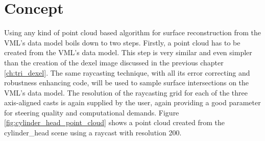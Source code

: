\section{Concept}
\label{sec:point_cloud_concept}

Using any kind of point cloud based algorithm for surface reconstruction from the VML's data model boils down to two steps.
Firstly, a point cloud has to be created from the VML's data model.
This step is very similar and even simpler than the creation of the dexel image discussed in the previous chapter \ref{ch:tri_dexel}.
The same raycasting technique, with all its error correcting and robustness enhancing code, will be used to sample surface intersections on the VML's data model.
The resolution of the raycasting grid for each of the three axis-aligned casts is again supplied by the user, again providing a good parameter for steering quality and computational demands.
Figure \ref{fig:cylinder_head_point_cloud} shows a point cloud created from the cylinder\_head scene using a raycast with resolution 200.
%
